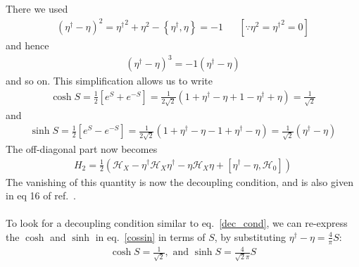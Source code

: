 \documentclass[twoside]{report}
\numberwithin{equation}{section}
\begin{document}
There we used
\begin{equation}\begin{aligned}
	\left(\eta^\dagger - \eta\right)^2 = {\eta^\dagger}^2 + \eta^2 - \left\{\eta^\dagger,\eta\right\} = -1 &&\left[\because\eta^2 = {\eta^\dagger}^2=0\right]
\end{aligned}\end{equation}
and hence
\begin{equation}\begin{aligned}
	\left(\eta^\dagger - \eta\right)^3 = -1\left(\eta^\dagger - \eta\right)
\end{aligned}\end{equation}
and so on. This simplification allows us to write
\begin{equation}\begin{aligned}
	\label{cossin}
	\cosh S = \frac{1}{2}\left[e^S + e^{-S}\right] = \frac{1}{2\sqrt 2}\left(1 + \eta^\dagger - \eta + 1 - \eta^\dagger + \eta\right) = \frac{1}{\sqrt 2}
\end{aligned}\end{equation}
and
\begin{equation}\begin{aligned}
	\sinh S = \frac{1}{2}\left[e^S - e^{-S}\right] = \frac{1}{2\sqrt 2}\left(1 + \eta^\dagger - \eta - 1 + \eta^\dagger - \eta\right) = \frac{1}{\sqrt 2}\left(\eta^\dagger - \eta\right)
\end{aligned}\end{equation}
The off-diagonal part now becomes
\begin{equation}\begin{aligned}
	H_2 = \frac{1}{2}\left(\mathcal{H}_X - \eta^\dagger \mathcal{H}_X \eta^\dagger - \eta \mathcal{H}_X \eta + \left[\eta^\dagger - \eta, \mathcal{H}_0\right]\right)
\end{aligned}\end{equation}
The vanishing of this quantity is now the decoupling condition, and is also given in eq 16 of ref.~\cite{holography1}.
\\\\To look for a decoupling condition similar to eq.~\ref{dec_cond}, we can re-express the \(\cosh\) and \(\sinh\) in eq.~\ref{cossin} in terms of \(S\), by substituting \(\eta^\dagger - \eta = \frac{4}{\pi}S\):
\begin{equation}\begin{aligned}
\cosh S = \frac{1}{\sqrt 2},\text{ and } \sinh S = \frac{4}{\sqrt 2 \pi}S
\end{aligned}\end{equation}
\end{document}
